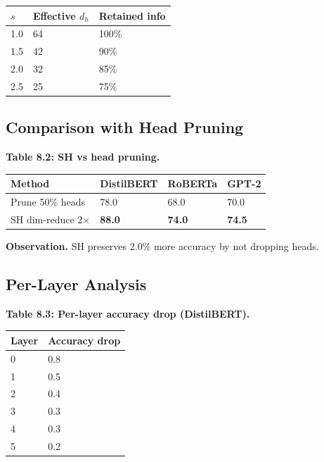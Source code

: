 \begin{table}[H]
\centering
\small
\begin{tabular}{lll}
\toprule
\textbf{$s$} & \textbf{Effective $d_h$} & \textbf{Retained info} \\
\midrule
1.0 & 64 & 100\% \\
1.5 & 42 & 90\% \\
2.0 & 32 & 85\% \\
2.5 & 25 & 75\% \\
\bottomrule
\end{tabular}
\end{table}

\subsection{Comparison with Head Pruning}

\textbf{Table 8.2: SH vs head pruning.}

\begin{table}[H]
\centering
\small
\begin{tabular}{llll}
\toprule
\textbf{Method} & \textbf{DistilBERT} & \textbf{RoBERTa} & \textbf{GPT-2} \\
\midrule
Prune 50\% heads & 78.0 & 68.0 & 70.0 \\
SH dim-reduce 2$\times$ & \textbf{88.0} & \textbf{74.0} & \textbf{74.5} \\
\bottomrule
\end{tabular}
\end{table}

\textbf{Observation.} SH preserves 2.0\% more accuracy by not dropping 
heads.

\subsection{Per-Layer Analysis}

\textbf{Table 8.3: Per-layer accuracy drop (DistilBERT).}

\begin{table}[H]
\centering
\small
\begin{tabular}{ll}
\toprule
\textbf{Layer} & \textbf{Accuracy drop} \\
\midrule
0 & 0.8 \\
1 & 0.5 \\
2 & 0.4 \\
3 & 0.3 \\
4 & 0.3 \\
5 & 0.2 \\
\bottomrule
\end{tabular}
\end{table}

